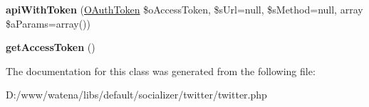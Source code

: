 \begin{DoxyCompactItemize}
\item 
\hypertarget{class_twitter_abe2142bab825259da8e762d7961f609a}{{\bfseries api\-With\-Token} (\hyperlink{class_o_auth_token}{O\-Auth\-Token} \$o\-Access\-Token, \$s\-Url=null, \$s\-Method=null, array \$a\-Params=array())}\label{class_twitter_abe2142bab825259da8e762d7961f609a}

\item 
\hypertarget{class_twitter_abacc0b5d0e2c834fa7c5790d23cf8d3f}{{\bfseries get\-Access\-Token} ()}\label{class_twitter_abacc0b5d0e2c834fa7c5790d23cf8d3f}

\end{DoxyCompactItemize}


The documentation for this class was generated from the following file\-:\begin{DoxyCompactItemize}
\item 
D\-:/www/watena/libs/default/socializer/twitter/twitter.\-php\end{DoxyCompactItemize}
